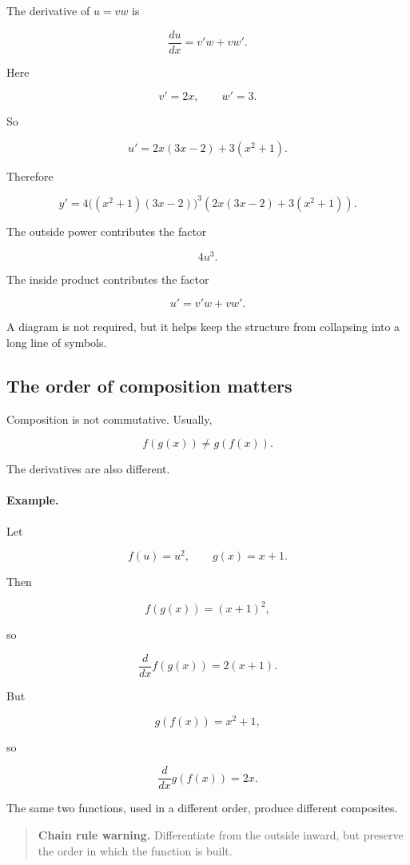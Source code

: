 The derivative of \(u=vw\) is

\[
\frac{du}{dx}=v'w+vw'.
\]

Here

\[
v'=2x,
\qquad
w'=3.
\]

So

\[
u'=2x(3x-2)+3(x^2+1).
\]

Therefore

\[
\boxed{
y'
=
4\bigl((x^2+1)(3x-2)\bigr)^3
\left(2x(3x-2)+3(x^2+1)\right).
}
\]

The outside power contributes the factor

\[
4u^3.
\]

The inside product contributes the factor

\[
u'=v'w+vw'.
\]

A diagram is not required, but it helps keep the structure from collapsing into a long line of symbols.

\subsection{The order of composition matters}
\label{subsec:composition-order-warning}

Composition is not commutative.  Usually,

\[
f(g(x))\neq g(f(x)).
\]

The derivatives are also different.

\paragraph{Example.}
Let

\[
f(u)=u^2,
\qquad
g(x)=x+1.
\]

Then

\[
f(g(x))=(x+1)^2,
\]

so

\[
\frac{d}{dx}f(g(x))=2(x+1).
\]

But

\[
g(f(x))=x^2+1,
\]

so

\[
\frac{d}{dx}g(f(x))=2x.
\]

The same two functions, used in a different order, produce different composites.

\begin{quote}
\textbf{Chain rule warning.}
Differentiate from the outside inward, but preserve the order in which the function is built.
\end{quote}

